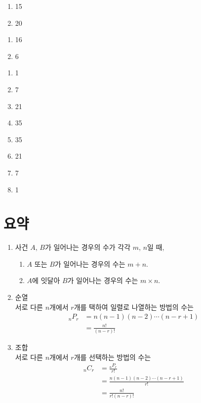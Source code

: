 \documentclass{oblivoir}
\begin{document}
\begin{multicols*}{2}
%

%

%

%
\begin{enumerate}
\item
15
\item
20
\end{enumerate}

%
\begin{enumerate}
\item
16
\item
6
\end{enumerate}

%
\begin{enumerate}
\item
1
\item
7
\item
21
\item
35
\item
35
\item
21
\item
7
\item
1
\end{enumerate}
\end{multicols*}

\section*{요약}
\begin{enumerate}[label=\arabic*.,itemsep=40pt]
\item
사건 \(A\), \(B\)가 일어나는 경우의 수가 각각 \(m\), \(n\)일 때,
\begin{enumerate}
\item
\(A\) 또는 \(B\)가 일어나는 경우의 수는 \(m+n\).
\item
\(A\)에 잇달아 \(B\)가 일어나는 경우의 수는 \(m\times n\).
\end{enumerate}
\item
순열\\[10pt]
서로 다른 \(n\)개에서 \(r\)개를 택하여 일렬로 나열하는 방법의 수는
\begin{align*}
_nP_r
&=n(n-1)(n-2)\cdots(n-r+1)\\
&=\frac{n!}{(n-r)!}
\end{align*}
\item
조합\\[10pt]
서로 다른 \(n\)개에서 \(r\)개를 선택하는 방법의 수는
\begin{align*}
_nC_r
&=\frac{_nP_r}{r!}\\
&=\frac{n(n-1)(n-2)\cdots(n-r+1)}{r!}\\
&=\frac{n!}{r!(n-r)!}
\end{align*}
\end{enumerate}
\end{document}
